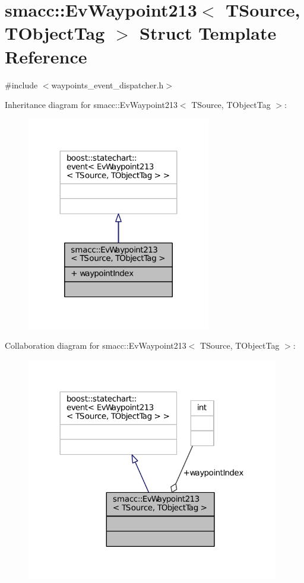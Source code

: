 \hypertarget{structsmacc_1_1EvWaypoint213}{}\section{smacc\+:\+:Ev\+Waypoint213$<$ T\+Source, T\+Object\+Tag $>$ Struct Template Reference}
\label{structsmacc_1_1EvWaypoint213}


{\ttfamily \#include $<$waypoints\+\_\+event\+\_\+dispatcher.\+h$>$}



Inheritance diagram for smacc\+:\+:Ev\+Waypoint213$<$ T\+Source, T\+Object\+Tag $>$\+:
\nopagebreak
\begin{figure}[H]
\begin{center}
\leavevmode
\includegraphics[width=227pt]{structsmacc_1_1EvWaypoint213__inherit__graph}
\end{center}
\end{figure}


Collaboration diagram for smacc\+:\+:Ev\+Waypoint213$<$ T\+Source, T\+Object\+Tag $>$\+:
\nopagebreak
\begin{figure}[H]
\begin{center}
\leavevmode
\includegraphics[width=312pt]{structsmacc_1_1EvWaypoint213__coll__graph}
\end{center}
\end{figure}
